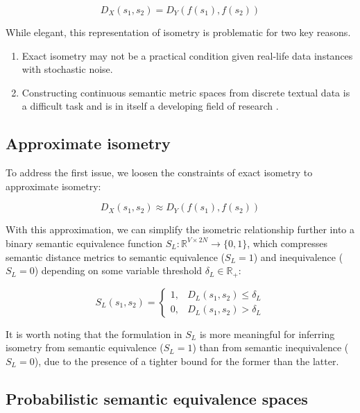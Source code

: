 \documentclass[11pt,a4paper]{article}
\begin{document}
\begin{equation}
  \label{exact_isometry_eqn}
  D_X(s_1,s_2) = D_Y(f(s_1),f(s_2))
\end{equation}

While elegant, this representation of isometry is problematic for two key
reasons.

\begin{enumerate}
  \item Exact isometry may not be a practical condition given real-life data
  instances with stochastic noise.
  \item Constructing continuous semantic metric spaces from discrete textual
  data is a difficult task and is in itself a developing field of research
  \cite{cer2017semeval, michel2019evaluation}.
\end{enumerate}

\subsection{Approximate isometry}

To address the first issue, we loosen the constraints of exact isometry to
approximate isometry:

\begin{equation}
  \label{approx_isometry_eqn}
  D_X(s_1,s_2) \approx D_Y(f(s_1),f(s_2)) 
\end{equation}

With this approximation, we can simplify the isometric relationship further into
a binary semantic equivalence function $S_L: \mathbb{R}^{V \times 2N} \to
\{0,1\}$, which compresses semantic distance metrics to semantic equivalence
($S_L=1$) and inequivalence ($S_L=0$) depending on some variable threshold
$\delta_L \in \mathbb{R}_+$:

\begin{equation}
  \label{bounded_isometry_eqn}
  S_L(s_1,s_2) =
  \begin{cases}
    1, &D_L(s_1,s_2) \leq \delta_L \\
    0, &D_L(s_1,s_2) > \delta_L
  \end{cases}
\end{equation}

It is worth noting that the formulation in $S_L$ is more meaningful for
inferring isometry from semantic equivalence ($S_L=1$) than from semantic
inequivalence ($S_L=0$), due to the presence of a tighter bound for the former
than the latter.

\subsection{Probabilistic semantic equivalence spaces}
\end{document}
